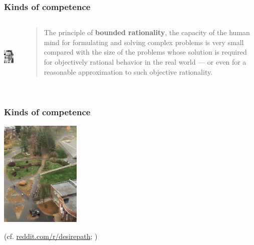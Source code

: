 \documentclass[compress]{beamer}
\begin{document}
\begin{frame}
\frametitle{Kinds of competence}
\begin{columns}[T]  
   \begin{column}{.2\textwidth}
	  \vspace{20pt}
	  \includegraphics[height=1.2in]{simon.jpg}   
   \end{column}
   \begin{column}{.75\textwidth}
      \begin{block}{}
      \begin{quote}
	   The principle of \textbf{bounded rationality}, the capacity of the human mind for formulating and solving complex problems is very small compared with the size of the problems whose solution is required for objectively rational behavior in the real world --- or even for a reasonable approximation to such objective rationality. 
      \end{quote}           
      \end{block}
    \end{column}
  \end{columns}
\vfill \hfill  \citep{simon1947}
\end{frame}


\begin{frame}
\frametitle{Kinds of competence}
	\begin{center}
	  \includegraphics[height=2in]{keller.jpg}   
	 \end{center}
\vfill \hfill (cf. \href{http://i.imgur.com/PAQb1ith.jpg}{reddit.com/r/desirepath}; \cite{Keller:1994})

\end{frame}
\end{document}
